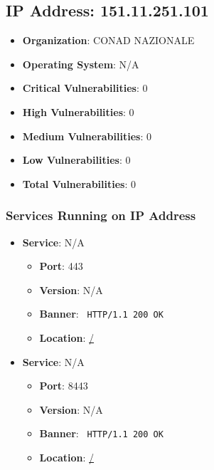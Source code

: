 \documentclass{article}
\begin{document}
\begin{itemize}
\end{itemize}




\clearpage



\subsection*{IP Address: 151.11.251.101}

\begin{itemize}
    \item \textbf{Organization}: CONAD NAZIONALE
    \item \textbf{Operating System}:  N/A 
    \item \textbf{Critical Vulnerabilities}: 0
    \item \textbf{High Vulnerabilities}: 0
    \item \textbf{Medium Vulnerabilities}: 0
    \item \textbf{Low Vulnerabilities}: 0
    \item \textbf{Total Vulnerabilities}: 0
\end{itemize}

\subsubsection*{Services Running on IP Address}

\begin{itemize}
    
        \item \textbf{Service}: N/A
        \begin{itemize}
            \item \textbf{Port}: 443
            \item \textbf{Version}:  N/A 
            \item \textbf{Banner}: \texttt{
                HTTP/1.1 200 OK
            }
            \item \textbf{Location}: \href{ / }{ / }
        \end{itemize}
    
        \item \textbf{Service}: N/A
        \begin{itemize}
            \item \textbf{Port}: 8443
            \item \textbf{Version}:  N/A 
            \item \textbf{Banner}: \texttt{
                HTTP/1.1 200 OK
            }
            \item \textbf{Location}: \href{ / }{ / }
        \end{itemize}
    
\end{itemize}
\end{document}
